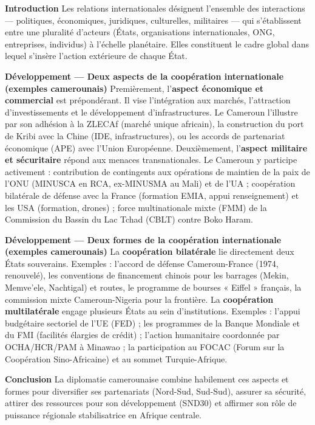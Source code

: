 \documentclass[11pt]{article}
\newcommand{\cle}[1]{{\popxbold\color{popdark}#1}}
\begin{document}
\begin{corrige}
\textbf{Introduction}
Les \cle{relations internationales} désignent l'ensemble des interactions — politiques, économiques, juridiques, culturelles, militaires — qui s'établissent entre une pluralité d'acteurs (États, organisations internationales, ONG, entreprises, individus) à l'échelle planétaire. Elles constituent le cadre global dans lequel s'insère l'action extérieure de chaque État.

\textbf{Développement — Deux aspects de la coopération internationale (exemples camerounais)}
Premièrement, l'\textbf{aspect économique et commercial} est prépondérant. Il vise l'intégration aux marchés, l'attraction d'investissements et le développement d'infrastructures. Le Cameroun l'illustre par son adhésion à la \cle{ZLECAf} (marché unique africain), la construction du port de Kribi avec la Chine (IDE, infrastructures), ou les accords de partenariat économique (APE) avec l'Union Européenne.
Deuxièmement, l'\textbf{aspect militaire et sécuritaire} répond aux menaces transnationales. Le Cameroun y participe activement : contribution de contingents aux opérations de maintien de la paix de l'ONU (MINUSCA en RCA, ex-MINUSMA au Mali) et de l'UA ; coopération bilatérale de défense avec la France (formation EMIA, appui renseignement) et les USA (formation, drones) ; force multinationale mixte (FMM) de la Commission du Bassin du Lac Tchad (CBLT) contre Boko Haram.

\textbf{Développement — Deux formes de la coopération internationale (exemples camerounais)}
La \textbf{coopération bilatérale} lie directement deux États souverains. Exemples : l'accord de défense Cameroun-France (1974, renouvelé), les conventions de financement chinois pour les barrages (Mekin, Memve'ele, Nachtigal) et routes, le programme de bourses « Eiffel » français, la commission mixte Cameroun-Nigeria pour la frontière.
La \textbf{coopération multilatérale} engage plusieurs États au sein d'institutions. Exemples : l'appui budgétaire sectoriel de l'UE (FED) ; les programmes de la Banque Mondiale et du FMI (facilités élargies de crédit) ; l'action humanitaire coordonnée par OCHA/HCR/PAM à Minawao ; la participation au FOCAC (Forum sur la Coopération Sino-Africaine) et au sommet Turquie-Afrique.

\textbf{Conclusion}
La diplomatie camerounaise combine habilement ces aspects et formes pour diversifier ses partenariats (Nord-Sud, Sud-Sud), assurer sa sécurité, attirer des ressources pour son développement (SND30) et affirmer son rôle de puissance régionale stabilisatrice en Afrique centrale.
\end{corrige}
\end{document}
